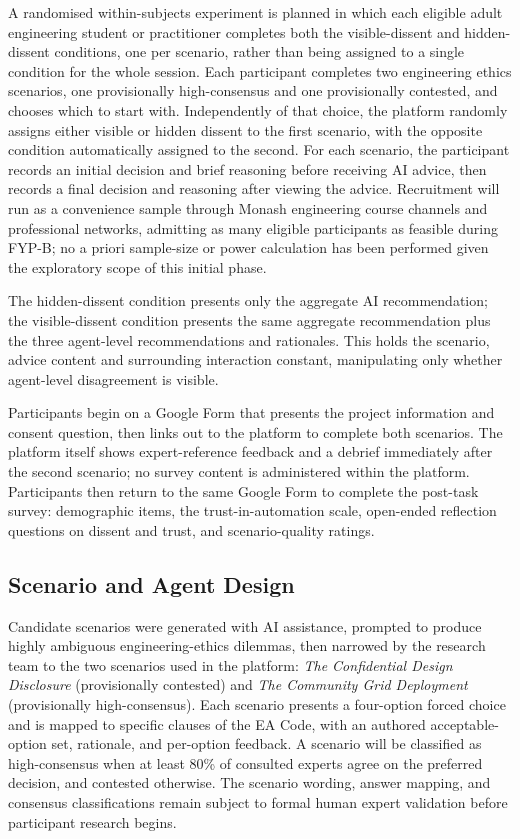 \documentclass[conference]{IEEEtran}
\begin{document}
A randomised within-subjects experiment is planned in which each eligible adult engineering student or practitioner completes both the visible-dissent and hidden-dissent conditions, one per scenario, rather than being assigned to a single condition for the whole session. Each participant completes two engineering ethics scenarios, one provisionally high-consensus and one provisionally contested, and chooses which to start with. Independently of that choice, the platform randomly assigns either visible or hidden dissent to the first scenario, with the opposite condition automatically assigned to the second. For each scenario, the participant records an initial decision and brief reasoning before receiving AI advice, then records a final decision and reasoning after viewing the advice. Recruitment will run as a convenience sample through Monash engineering course channels and professional networks, admitting as many eligible participants as feasible during FYP-B; no a priori sample-size or power calculation has been performed given the exploratory scope of this initial phase.

The hidden-dissent condition presents only the aggregate AI recommendation; the visible-dissent condition presents the same aggregate recommendation plus the three agent-level recommendations and rationales. This holds the scenario, advice content and surrounding interaction constant, manipulating only whether agent-level disagreement is visible.

Participants begin on a Google Form that presents the project information and consent question, then links out to the platform to complete both scenarios. The platform itself shows expert-reference feedback and a debrief immediately after the second scenario; no survey content is administered within the platform. Participants then return to the same Google Form to complete the post-task survey: demographic items, the trust-in-automation scale, open-ended reflection questions on dissent and trust, and scenario-quality ratings.

\subsection{Scenario and Agent Design}

Candidate scenarios were generated with AI assistance, prompted to produce highly ambiguous engineering-ethics dilemmas, then narrowed by the research team to the two scenarios used in the platform: \textit{The Confidential Design Disclosure} (provisionally contested) and \textit{The Community Grid Deployment} (provisionally high-consensus). Each scenario presents a four-option forced choice and is mapped to specific clauses of the EA Code, with an authored acceptable-option set, rationale, and per-option feedback. A scenario will be classified as high-consensus when at least 80\% of consulted experts agree on the preferred decision, and contested otherwise. The scenario wording, answer mapping, and consensus classifications remain subject to formal human expert validation before participant research begins.
\end{document}
